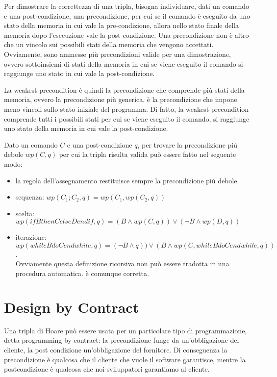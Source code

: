 Per dimostrare la correttezza di una tripla, bisogna individuare, dati
un comando e una post-condizione, una precondizione, per cui se il comando
è eseguito da uno stato della memoria in cui vale la pre-condizione, allora
nello stato finale della memoria dopo l'esecuzione vale la post-condizione.
Una precondizione non è altro che un vincolo sui possibili stati della memoria
che vengono accettati. Ovviamente, sono ammesse più precondizioni valide per
una dimostrazione, ovvero sottoinsiemi di stati della memoria in cui se viene
eseguito il comando si raggiunge uno stato in cui vale la post-condizione.

La weakest precondition è quindi la precondizione che comprende più stati
della memoria, ovvero la precondizione più generica.
è la precondizione che impone meno vincoli sullo stato iniziale del programma.
Di fatto, la weakest precondition comprende tutti i possibili stati per cui
se viene eseguito il comando, si raggiunge uno stato della memoria in cui vale
la post-condizione.

Dato un comando $C$ e una post-condizione $q$, per trovare la precondizione più debole $wp(C, q)$
per cui la tripla risulta valida può essere fatto nel seguente modo:
\begin{itemize}
    \item la regola dell'assegnamento restituisce sempre la precondizione più debole.
    \item sequenza: $wp(C_1;C_2, q) = wp(C_1, wp(C_2, q))$
    \item scelta: $wp(if B then C else D endif, q) = (B \land wp(C, q)) \lor
    (\lnot B \land wp(D, q))$
    \item iterazione: $wp(while B do C endwhile, q) = (\lnot B \land q)) \lor
    (B \land wp(C;while B do C endwhile, q))$.\\
    Ovviamente questa definizione ricorsiva non può essere tradotta in una procedura
    automatica. è comunque corretta.
\end{itemize}

\section{Design by Contract}
Una tripla di Hoare può essere usata per un particolare tipo di programmazione,
detta programming by contract: la precondizione funge da un'obbligazione
del cliente, la post condizione un'obbligazione del fornitore.
Di conseguenza la precondizione è qualcosa che il cliente che vuole il
software garantisce, mentre la postcondizione è qualcosa che noi sviluppatori
garantiamo al cliente.
